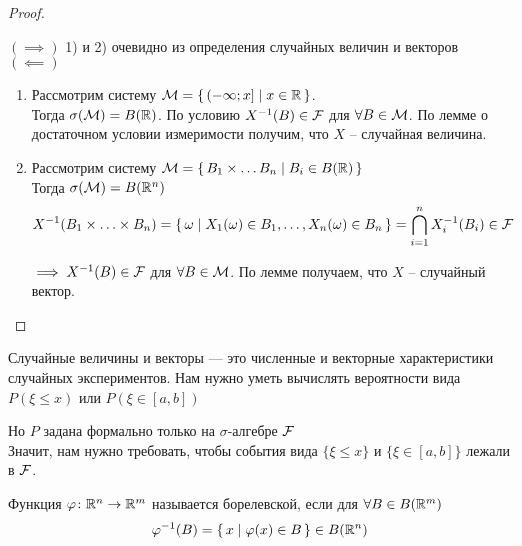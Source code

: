 \begin{proof}~

  $(\implies)$ 1) и 2) очевидно из определения случайных величин и векторов\\

  $(\impliedby)$ \nolinebreak
  \begin{enumerate}
    \item 
      Рассмотрим систему $\mathcal{M} = \left\{ \, (-\infty; x] \mid x \in \mathbb{R} \, \right\}$.\\
      Тогда  $\sigma(\mathcal{M}) = B(\mathbb{R})$. По условию $X^{-1} (B) \in \mathcal{F}$ для 
      $\forall B \in \mathcal{M}$. По лемме о достаточном условии измеримости получим, 
      что $X$ -- случайная величина.

    \item 
      Рассмотрим систему $\mathcal{M} = \left\{ \, B_1 \times \ldots B_n \mid B_i \in B(\mathbb{R}) \, \right\}$\\
      Тогда $\sigma(\mathcal{M}) = B(\mathbb{R}^n)$
      \begin{align*}
        &X^{-1} (B_1 \times \ldots \times B_n) = 
        \left\{ \, \omega \mid X_1(\omega) \in B_1, \ldots, X_n(\omega) \in B_n \, \right\}
        = \bigcap_{i = 1}^{n} X^{-1}_i (B_i) \in \mathcal{F}
      \end{align*}

      $\implies X^{-1} (B) \in \mathcal{F}$ для $\forall B \in \mathcal{M}$. По лемме получаем, 
      что $X$ -- случайный вектор.
  \end{enumerate}

\end{proof}


Случайные величины и векторы --- это численные и векторные характеристики случайных экспериментов. Нам нужно уметь вычислять вероятности вида $P(\xi \leq x)$ или $P(\xi \in [a, b])$

Но $P$ задана формально только на $\sigma$-алгебре $\mathcal{F}$\\
Значит, нам нужно требовать, чтобы события вида $\{ \xi \leq x \}$ и 
$\{\xi \in [a, b]\}$ лежали в $\mathcal{F}$.


\begin{definition}
  Функция $\varphi\colon \mathbb{R}^n \to \mathbb{R}^m$ называется борелевской, 
  если для $\forall B \in B(\mathbb{R}^m)$
  \begin{align*}
    \varphi^{-1} (B) = \left\{ \, x \mid \varphi(x) \in B \, \right\} \in B(\mathbb{R}^n)
  \end{align*}
\end{definition}

